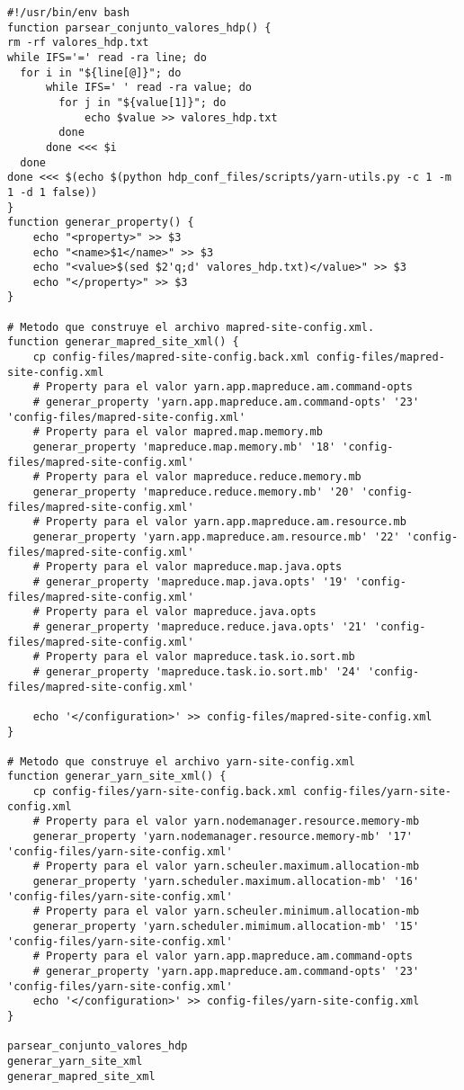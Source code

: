 \begin{lstlisting}
#!/usr/bin/env bash
function parsear_conjunto_valores_hdp() {
rm -rf valores_hdp.txt
while IFS='=' read -ra line; do
  for i in "${line[@]}"; do
      while IFS=' ' read -ra value; do
      	for j in "${value[1]}"; do
      		echo $value >> valores_hdp.txt
      	done
      done <<< $i
  done
done <<< $(echo $(python hdp_conf_files/scripts/yarn-utils.py -c 1 -m 1 -d 1 false))
}
function generar_property() {
	echo "<property>" >> $3
	echo "<name>$1</name>" >> $3
	echo "<value>$(sed $2'q;d' valores_hdp.txt)</value>" >> $3
	echo "</property>" >> $3
}

# Metodo que construye el archivo mapred-site-config.xml.
function generar_mapred_site_xml() {
	cp config-files/mapred-site-config.back.xml config-files/mapred-site-config.xml
	# Property para el valor yarn.app.mapreduce.am.command-opts
	# generar_property 'yarn.app.mapreduce.am.command-opts' '23' 'config-files/mapred-site-config.xml'
	# Property para el valor mapred.map.memory.mb
	generar_property 'mapreduce.map.memory.mb' '18' 'config-files/mapred-site-config.xml'
	# Property para el valor mapreduce.reduce.memory.mb
	generar_property 'mapreduce.reduce.memory.mb' '20' 'config-files/mapred-site-config.xml'
	# Property para el valor yarn.app.mapreduce.am.resource.mb
	generar_property 'yarn.app.mapreduce.am.resource.mb' '22' 'config-files/mapred-site-config.xml'
	# Property para el valor mapreduce.map.java.opts
	# generar_property 'mapreduce.map.java.opts' '19' 'config-files/mapred-site-config.xml'
	# Property para el valor mapreduce.java.opts
	# generar_property 'mapreduce.reduce.java.opts' '21' 'config-files/mapred-site-config.xml'
	# Property para el valor mapreduce.task.io.sort.mb
	# generar_property 'mapreduce.task.io.sort.mb' '24' 'config-files/mapred-site-config.xml'

	echo '</configuration>' >> config-files/mapred-site-config.xml 
}

# Metodo que construye el archivo yarn-site-config.xml
function generar_yarn_site_xml() {
	cp config-files/yarn-site-config.back.xml config-files/yarn-site-config.xml
	# Property para el valor yarn.nodemanager.resource.memory-mb
	generar_property 'yarn.nodemanager.resource.memory-mb' '17' 'config-files/yarn-site-config.xml'
	# Property para el valor yarn.scheuler.maximum.allocation-mb
	generar_property 'yarn.scheduler.maximum.allocation-mb' '16' 'config-files/yarn-site-config.xml'
	# Property para el valor yarn.scheuler.minimum.allocation-mb
	generar_property 'yarn.scheduler.mimimum.allocation-mb' '15' 'config-files/yarn-site-config.xml'
	# Property para el valor yarn.app.mapreduce.am.command-opts
	# generar_property 'yarn.app.mapreduce.am.command-opts' '23' 'config-files/yarn-site-config.xml'
	echo '</configuration>' >> config-files/yarn-site-config.xml
}

parsear_conjunto_valores_hdp
generar_yarn_site_xml
generar_mapred_site_xml
\end{lstlisting}